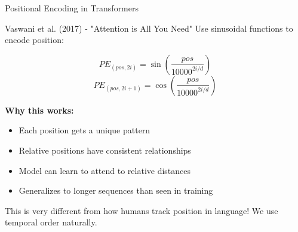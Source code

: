 \documentclass[aspectratio=169]{beamer}
\begin{document}
\begin{frame}{Positional Encoding in Transformers 🔢}
\small
    \begin{block}{Vaswani et al. (2017) - "Attention is All You Need"}
        Use sinusoidal functions to encode position:
    \end{block}

    \vspace{0.3cm}

    $$PE_{(pos, 2i)} = \sin\left(\frac{pos}{10000^{2i/d}}\right)$$
    $$PE_{(pos, 2i+1)} = \cos\left(\frac{pos}{10000^{2i/d}}\right)$$

    \vspace{0.3cm}

    \textbf{Why this works:}
    \begin{itemize}\setlength{\itemsep}{0pt}
        \item Each position gets a unique pattern
        \item Relative positions have consistent relationships
        \item Model can learn to attend to relative distances
        \item Generalizes to longer sequences than seen in training
    \end{itemize}

    \vspace{0.3cm}

    \begin{thinkaboutit}
        This is very different from how humans track position in language! We use temporal order naturally.
    \end{thinkaboutit}
\end{frame}
\end{document}
